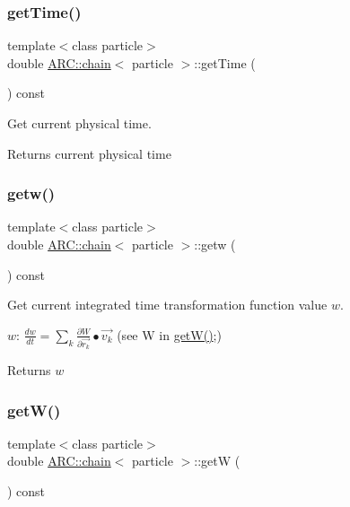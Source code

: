 \subsubsection{\texorpdfstring{get\+Time()}{getTime()}}
{\footnotesize\ttfamily template$<$class particle$>$ \\
double \hyperlink{classARC_1_1chain}{A\+R\+C\+::chain}$<$ particle $>$\+::get\+Time (\begin{DoxyParamCaption}{ }\end{DoxyParamCaption}) const\hspace{0.3cm}{\ttfamily [inline]}}



Get current physical time. 

\begin{DoxyReturn}{Returns}
current physical time 
\end{DoxyReturn}
\hypertarget{classARC_1_1chain_a122985d69620f87c68ae43f4c87e4f00}{}\label{classARC_1_1chain_a122985d69620f87c68ae43f4c87e4f00} 
\subsubsection{\texorpdfstring{getw()}{getw()}}
{\footnotesize\ttfamily template$<$class particle$>$ \\
double \hyperlink{classARC_1_1chain}{A\+R\+C\+::chain}$<$ particle $>$\+::getw (\begin{DoxyParamCaption}{ }\end{DoxyParamCaption}) const\hspace{0.3cm}{\ttfamily [inline]}}



Get current integrated time transformation function value $w$. 

$w$\+: $ \frac{dw}{dt} = \sum_k \frac{\partial W}{\partial \vec{r_k}} \bullet \vec{v_k} $ (see W in \hyperlink{classARC_1_1chain_a43f7ea8573dcbc4849232c97be26456f}{get\+W()};) \begin{DoxyReturn}{Returns}
$w$ 
\end{DoxyReturn}
\hypertarget{classARC_1_1chain_a43f7ea8573dcbc4849232c97be26456f}{}\label{classARC_1_1chain_a43f7ea8573dcbc4849232c97be26456f} 
\subsubsection{\texorpdfstring{get\+W()}{getW()}}
{\footnotesize\ttfamily template$<$class particle$>$ \\
double \hyperlink{classARC_1_1chain}{A\+R\+C\+::chain}$<$ particle $>$\+::getW (\begin{DoxyParamCaption}{ }\end{DoxyParamCaption}) const\hspace{0.3cm}{\ttfamily [inline]}}




